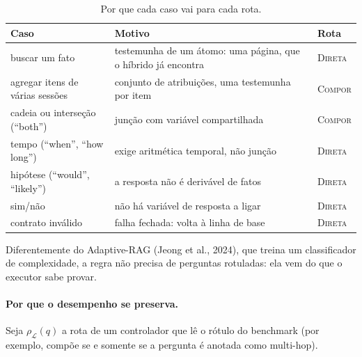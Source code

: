 \documentclass[11pt]{article}
\newcommand{\Compose}{\textsc{Compor}}
\newcommand{\Direct}{\textsc{Direta}}
\begin{document}
\begin{table}[h]
\centering\small
\caption{Por que cada caso vai para cada rota.}\label{tab:rota}
\begin{tabularx}{\textwidth}{@{}l>{\raggedright}Xl@{}}
\toprule
Caso & Motivo & Rota \\
\midrule
buscar um fato & testemunha de um átomo: uma página, que o híbrido já encontra & \Direct{} \\
agregar itens de várias sessões & conjunto de atribuições, uma testemunha por item & \Compose{} \\
cadeia ou interseção (``both'') & junção com variável compartilhada & \Compose{} \\
tempo (``when'', ``how long'') & exige aritmética temporal, não junção & \Direct{} \\
hipótese (``would'', ``likely'') & a resposta não é derivável de fatos & \Direct{} \\
sim/não & não há variável de resposta a ligar & \Direct{} \\
contrato inválido & falha fechada: volta à linha de base & \Direct{} \\
\bottomrule
\end{tabularx}
\end{table}

Diferentemente do Adaptive-RAG (Jeong et al., 2024), que treina um
classificador de complexidade, a regra não precisa de perguntas rotuladas: ela
vem do que o executor sabe provar.

\paragraph{Por que o desempenho se preserva.}
Seja $\rho_{\mathcal{L}}(q)$ a rota de um controlador que lê o rótulo do
benchmark (por exemplo, compõe se e somente se a pergunta é anotada como
multi-hop).
\end{document}
